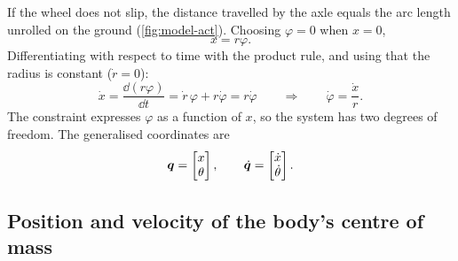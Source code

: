 If the wheel does not slip, the distance travelled by the axle equals the arc
length unrolled on the ground (\cref{fig:model-act}). Choosing $\varphi=0$
when $x=0$,
\begin{equation}
  x = r\varphi .
  \label{eq:rolling}
\end{equation}
Differentiating with respect to time with the product rule, and using that the
radius is constant ($\dot r = 0$):
\begin{equation}
  \dot x = \frac{\dd (r\varphi)}{\dd t} = \dot r\,\varphi + r\dot\varphi = r\dot\varphi
  \qquad\Longrightarrow\qquad
  \dot\varphi = \frac{\dot x}{r}.
  \label{eq:rolling-vel}
\end{equation}
The constraint expresses $\varphi$ as a function of $x$, so the system has two
degrees of freedom. The generalised coordinates are
\begin{equation}
  \bm{q} = \begin{bmatrix} x \\ \theta \end{bmatrix},
  \qquad
  \dot{\bm{q}} = \begin{bmatrix} \dot x \\ \dot\theta \end{bmatrix}.
\end{equation}

\subsection{Position and velocity of the body's centre of mass}

